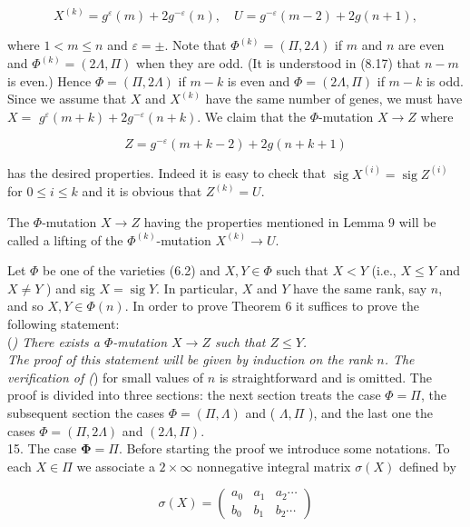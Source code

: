 \documentclass[10pt]{article}
\begin{document}
$$
X^{(k)}=g^{\varepsilon}(m)+2 g^{-\varepsilon}(n), \quad U=g^{-\varepsilon}(m-2)+2 g(n+1),
$$

where $1<m \leqslant n$ and $\varepsilon= \pm$. Note that $\Phi^{(k)}=(\Pi, 2 \Lambda)$ if $m$ and $n$ are even and $\Phi^{(k)}=(2 \Lambda, \Pi)$ when they are odd. (It is understood in (8.17) that $n-m$ is even.) Hence $\Phi=(\Pi, 2 \Lambda)$ if $m-k$ is even and $\Phi=(2 \Lambda, \Pi)$ if $m-k$ is odd. Since we assume that $X$ and $X^{(k)}$ have the same number of genes, we must have $X=$ $g^{\varepsilon}(m+k)+2 g^{-\varepsilon}(n+k)$. We claim that the $\Phi$-mutation $X \rightarrow Z$ where

$$
Z=g^{-\varepsilon}(m+k-2)+2 g(n+k+1)
$$

has the desired properties. Indeed it is easy to check that $\operatorname{sig} X^{(i)}=\operatorname{sig} Z^{(i)}$ for $0 \leqslant i \leqslant k$ and it is obvious that $Z^{(k)}=U$.

The $\Phi$-mutation $X \rightarrow Z$ having the properties mentioned in Lemma 9 will be called a lifting of the $\Phi^{(k)}$-mutation $X^{(k)} \rightarrow U$.

Let $\Phi$ be one of the varieties (6.2) and $X, Y \in \Phi$ such that $X<Y$ (i.e., $X \leqslant Y$ and $X \neq Y$ ) and sig $X=\operatorname{sig} Y$. In particular, $X$ and $Y$ have the same rank, say $n$, and so $X, Y \in \Phi(n)$. In order to prove Theorem 6 it suffices to prove the following statement:\\
(\textit{) There exists a $\Phi$-mutation $X \rightarrow Z$ such that $Z \leqslant Y$.\\
The proof of this statement will be given by induction on the rank $n$. The verification of (}) for small values of $n$ is straightforward and is omitted. The proof is divided into three sections: the next section treats the case $\Phi=\Pi$, the subsequent section the cases $\Phi=(\Pi, \Lambda)$ and ( $\Lambda, \Pi$ ), and the last one the cases $\Phi=(\Pi, 2 \Lambda)$ and $(2 \Lambda, \Pi)$.\\
15. The case $\boldsymbol{\Phi}=\Pi$. Before starting the proof we introduce some notations. To each $X \in \Pi$ we associate a $2 \times \infty$ nonnegative integral matrix $\sigma(X)$ defined by


\begin{equation*}
\sigma(X)=\left(\begin{array}{lll}
a_{0} & a_{1} & a_{2} \cdots \\
b_{0} & b_{1} & b_{2} \cdots
\end{array}\right) \tag{15.1}
\end{equation*}
\end{document}
